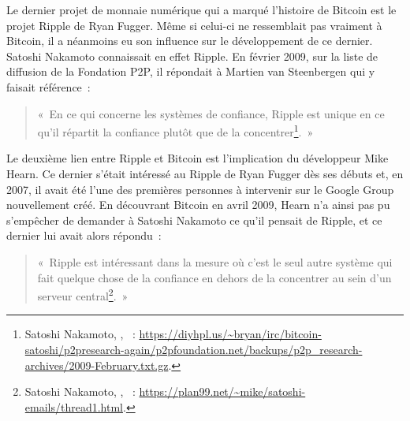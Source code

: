Le dernier projet de monnaie numérique qui a marqué l'histoire de Bitcoin est le projet Ripple de Ryan Fugger. Même si celui-ci ne ressemblait pas vraiment à Bitcoin, il a néanmoins eu son influence sur le développement de ce dernier. Satoshi Nakamoto connaissait en effet Ripple. En février 2009, sur la liste de diffusion de la Fondation P2P, il répondait à Martien van Steenbergen qui y faisait référence~:

\begin{quote}
«~En ce qui concerne les systèmes de confiance, Ripple est unique en ce qu'il répartit la confiance plutôt que de la concentrer\footnote{Satoshi Nakamoto, , ~: \url{https://diyhpl.us/~bryan/irc/bitcoin-satoshi/p2presearch-again/p2pfoundation.net/backups/p2p_research-archives/2009-February.txt.gz}.}.~»
\end{quote}

Le deuxième lien entre Ripple et Bitcoin est l'implication du développeur Mike Hearn. Ce dernier s'était intéressé au Ripple de Ryan Fugger dès ses débuts et, en 2007, il avait été l'une des premières personnes à intervenir sur le Google Group nouvellement créé. En découvrant Bitcoin en avril 2009, Hearn n'a ainsi pas pu s'empêcher de demander à Satoshi Nakamoto ce qu'il pensait de Ripple, et ce dernier lui avait alors répondu~:

\begin{quote}
«~Ripple est intéressant dans la mesure où c'est le seul autre système qui fait quelque chose de la confiance en dehors de la concentrer au sein d'un serveur central\footnote{Satoshi Nakamoto, , ~: \url{https://plan99.net/\~mike/satoshi-emails/thread1.html}.}.~»
\end{quote}

